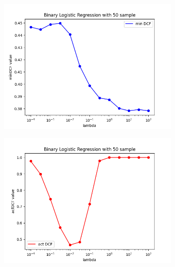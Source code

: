 \begin{figure}[h!]
    \centering
    \begin{subfigure}[b]{0.40\linewidth}
        \includegraphics[width=\linewidth]{Lab/08. Lab 08/Images/05. BLR - minDCF 50 Samples}
        \label{fig:BLR50SminDCF}
    \end{subfigure}
    \begin{subfigure}[b]{0.40\linewidth}
        \includegraphics[width=\linewidth]{Lab/08. Lab 08/Images/06. BLR - actDCF 50 Samples}
        \label{fig:BLR50SactDCF}
    \end{subfigure}
    \begin{subfigure}[b]{0.40\linewidth}

\end{subfigure}
\end{figure}
